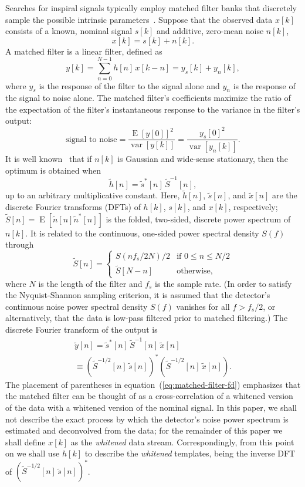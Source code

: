 \documentclass[preprint2]{aastex}
\DeclareMathOperator{\expectation}{E}
\DeclareMathOperator{\var}{var}
\begin{document}
Searches for inspiral signals typically employ matched filter
banks that discretely sample the possible intrinsic parameters~\citep{findchirppaper}.  Suppose that the observed data $x[k]$ consists of a known, nominal signal $s[k]$ and additive, zero-mean noise $n[k]$,
%
$$
	x[k] = s[k] + n[k].
$$
%
A matched filter is a linear filter, defined as
%
$$
	y[k] = \sum_{n=0}^{N-1} h[n] \, x[k-n] = y_s[k] + y_n[k],
$$
%
where $y_s$ is the response of the filter to the signal alone and $y_n$ is the response of the signal to noise alone.  The matched filter's coefficients maximize the ratio of the expectation of the filter's instantaneous response to the variance in the filter's output:
%
$$
\textrm{signal to noise} = \frac{\expectation \left[ y[0] \right]^2}{\var \left[ y[k] \right]} = \frac{y_s[0]^2}{\var \left[ y_n[k] \right]}.
$$
%
It is well known~\citep[see, for example,][]{matched-filter} that if $n[k]$ is Gaussian and wide-sense stationary, then the optimum is obtained when
%
$$
\tilde{h}[n] = \tilde{s}^*[n] \, \tilde{S}^{-1}[n],
$$
%
up to an arbitrary multiplicative constant.  Here, $\tilde{h}[n]$, $\tilde{s}[n]$, and $\tilde{x}[n]$ are the discrete Fourier transforms (DFTs) of $h[k]$, $s[k]$, and $x[k]$, respectively; $\tilde{S}[n] = \expectation \left[ \tilde{n}[n] \tilde{n}^* [n] \right]$ is the folded, two-sided, discrete power spectrum of $n[k]$.  It is related to the continuous, one-sided power spectral density $S(f)$ through
$$
	\tilde{S}[n] =
	\begin{cases}
		S(n f_s / 2 N) / 2 & \textrm{if } 0 \leqslant n \leqslant N / 2 \\
		\tilde{S}[N - n] & \textrm{otherwise},
	\end{cases}
$$
where $N$ is the length of the filter and $f_s$ is the sample rate.  (In order to satisfy the Nyquist-Shannon sampling criterion, it is assumed that the detector's continuous noise power spectral density $S(f)$ vanishes for all $f > f_s / 2$, or alternatively, that the data is low-pass filtered prior to matched filtering.)  The discrete Fourier transform of the output is
%
\begin{multline}
\label{eq:matched-filter-fd}
\tilde{y}[n] = \tilde{s}^*[n] \, \tilde{S}^{-1}[n] \, \tilde{x}[n] \\
\equiv \left(\tilde{S}^{-1/2}[n] \, \tilde{s}[n]\right)^* \left(\tilde{S}^{-1/2}[n] \, \tilde{x}[n] \right).
\end{multline}
%
The placement of parentheses in equation~(\ref{eq:matched-filter-fd}) emphasizes that the matched filter can be thought of as a cross-correlation of a whitened version of the data with a whitened version of the nominal signal.  In this paper, we shall not describe the exact process by which the detector's noise power spectrum is estimated and deconvolved from the data; for the remainder of this paper we shall define $x[k]$ as the \emph{whitened} data stream.  Correspondingly, from this point on we shall use $h[k]$ to describe the \emph{whitened} templates, being the inverse DFT of $\left(\tilde{S}^{-1/2}[n] \, \tilde{s}[n]\right)^*$.
\end{document}
